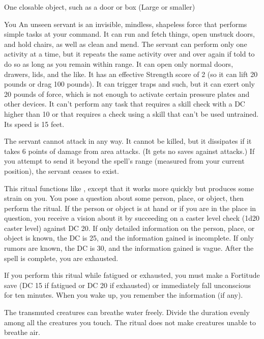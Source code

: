 \begin{spelltarget}{One closable object, such as a door or box (Large or smaller)}
\begin{spelltarget}{You}
\spelldur{\durlong \dismissable}
\spelleffect An unseen servant is an invisible, mindless, shapeless force that performs simple tasks at your command. It can run and fetch things, open unstuck doors, and hold chairs, as well as clean and mend. The servant can perform only one activity at a time, but it repeats the same activity over and over again if told to do so as long as you remain within range. It can open only normal doors, drawers, lids, and the like. It has an effective Strength score of 2 (so it can lift 20 pounds or drag 100 pounds). It can trigger traps and such, but it can exert only 20 pounds of force, which is not enough to activate certain pressure plates and other devices. It can't perform any task that requires a skill check with a DC higher than 10 or that requires a check using a skill that can't be used untrained. Its speed is 15 feet.
\par The servant cannot attack in any way. It cannot be killed, but it dissipates if it takes 6 points of damage from area attacks. (It gets no saves against attacks.) If you attempt to send it beyond the spell's range (measured from your current position), the servant ceases to exist.

\spelleffect This ritual functions like , except that it works more quickly but produces some strain on you. You pose a question about some person, place, or object, then perform the ritual. If the person or object is at hand or if you are in the place in question, you receive a vision about it by succeeding on a caster level check (1d20 \add caster level) against DC 20. If only detailed information on the person, place, or object is known, the DC is 25, and the information gained is incomplete. If only rumors are known, the DC is 30, and the information gained is vague. After the spell is complete, you are exhausted.
\par If you perform this ritual while fatigued or exhausted, you must make a Fortitude save (DC 15 if fatigued or DC 20 if exhausted) or immediately fall unconscious for ten minutes. When you wake up, you remember the information (if any).

\spelleffect The transmuted creatures can breathe water freely. Divide the duration evenly among all the creatures you touch.
\spellnotes The ritual does not make creatures unable to breathe air.


\end{spelltarget}
\end{spelltarget}
